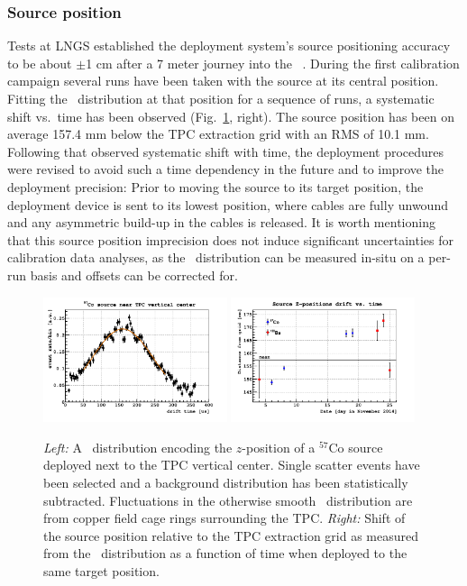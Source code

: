 \subsubsection{Source position}\label{sec:SourcePosition}
Tests at LNGS established the deployment system's source positioning accuracy to be about $\pm$1 cm after a 7 meter journey into the \dsf\ \lsv.
During the first calibration campaign several runs have been taken with the source at its central position. %
Fitting the \tdrift\ distribution at that position for a sequence of runs, a systematic shift vs.~time has been observed (Fig.~\ref{fig:SourcePosition}, right). The source position has been on average 157.4 mm below the TPC extraction grid with an RMS of 10.1 mm. Following that observed systematic shift with time, the deployment procedures were revised to avoid such a time dependency in the future and to improve the deployment precision: Prior to moving the source to its target position, the deployment device is sent to its lowest position, where cables are fully unwound and any asymmetric build-up in the cables is released. It is worth mentioning that this source position imprecision does not induce significant uncertainties for calibration data analyses, as the \tdrift\ distribution can be measured in-situ on a per-run basis and offsets can be corrected for.
\begin{figure}[htbp]
\centering
\includegraphics[width=0.48\textwidth]{./Figures/Tdrift_distribution_Co57.png}
\includegraphics[width=0.48\textwidth]{./Figures/SourcePosition_vs_time.png}
\caption{\textit{Left:} A \tdrift\ distribution encoding the $z$-position of a $^{57}$Co source deployed next to the TPC vertical center. Single scatter events have been selected and a background distribution has been statistically subtracted. Fluctuations in the otherwise smooth \tdrift\ distribution are from copper field cage rings surrounding the TPC.
\textit{Right:} Shift of the source position relative to the TPC extraction grid as measured from the \tdrift\ distribution as a function of time when deployed to the same target position.
\label{fig:SourcePosition}} 
\end{figure}


